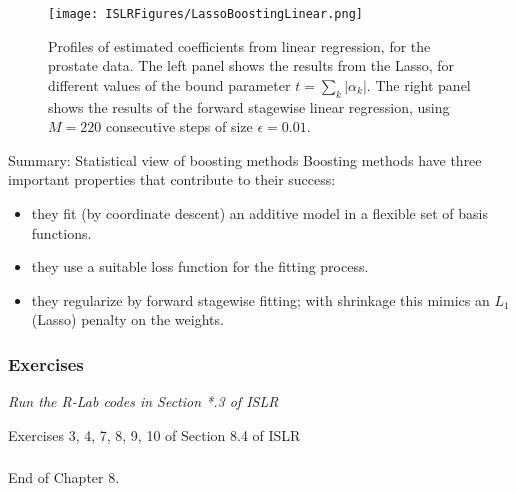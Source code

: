 \documentclass{beamer}
\begin{document}
                            \begin{frame}{}
                                        \begin{figure}
                          \centering
                          
                          \centering
                          \texttt{[image: ISLRFigures/LassoBoostingLinear.png]}
                          \caption{Profiles of estimated coefficients from linear regression, for the
prostate data. The left panel shows the results from the Lasso,
for different values of the bound parameter $t = \sum_k|\alpha_k|$. The right panel shows
the results of the forward stagewise linear regression, using $M = 220$ consecutive steps of size $\epsilon=0.01$.
                          }
                        \end{figure}
                            \end{frame}

              \begin{frame}{Summary: Statistical view of boosting methods}
                    Boosting methods have three important properties that contribute to their success:
                     \begin{itemize}
                      \item they fit (by coordinate descent) an additive model in a flexible set of basis functions.

                      \item they use a suitable loss function for the fitting process.

                      \item they regularize by forward stagewise fitting; with shrinkage this mimics an $L_1$ (Lasso) penalty on the weights.
                     \end{itemize}
                     \end{frame}
                      
\begin{frame}
\frametitle{Exercises  }
      			
      			
{\sl  Run the R-Lab codes in Section *.3 of ISLR
      				
Exercises 3, 4, 7, 8, 9, 10 of Section  8.4 of ISLR 
}
      			
\end{frame}
      		
      			\begin{frame}
      			\frametitle{  }
      				
      				
      				
      			End of Chapter 8. 
      				
      				
      			\end{frame}
      
    
\end{document}
